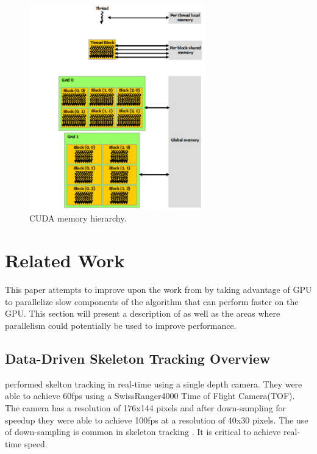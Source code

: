 \documentclass[conference]{IEEEtran}
\begin{document}
\begin{figure}[!t]
\centering
\includegraphics[width=3in]{memory-hierarchy}
\caption{CUDA memory hierarchy.}
\label{fig:memoryhierarchy}
\end{figure}

\section{Related Work}
\label{sec:relatedwork}
This paper attempts to improve upon the work from \cite{Baak2011} by taking advantage of GPU to parallelize slow components of the algorithm that can perform faster on the GPU. This section will present a description of \cite{Baak2011} as well as the areas where parallelism could potentially be used to improve performance.

\subsection{Data-Driven Skeleton Tracking Overview}
\label{subsec:algoverview}
\cite{Baak2011} performed skelton tracking in real-time using a single depth camera. They were able to achieve 60fps using a SwissRanger4000 Time of Flight Camera(TOF). The camera has a resolution of 176x144 pixels and after down-sampling for speedup they were able to achieve 100fps at a resolution of 40x30 pixels. The use of down-sampling is common in skeleton tracking \cite{Baak2011,Plagemann2010,Ganapathi2010,export:145347}. It is critical to achieve real-time speed.
\end{document}
